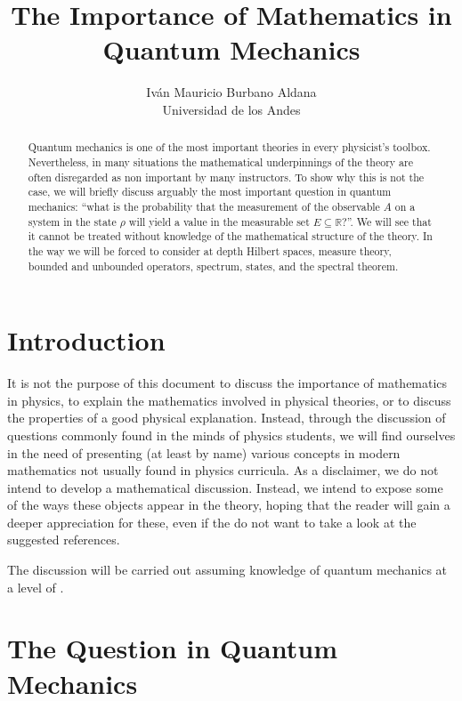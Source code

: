 \documentclass{article}
\title{The Importance of Mathematics in Quantum Mechanics}
\author{Iván Mauricio Burbano Aldana \\ Universidad de los Andes}
\begin{document}
\maketitle

\begin{abstract}

Quantum mechanics is one of the most important theories in every physicist's toolbox. Nevertheless, in many situations the mathematical underpinnings of the theory are often disregarded as non important by many instructors. To show why this is not the case, we will briefly discuss arguably the most important question in quantum mechanics: ``what is the probability that the measurement of the observable $A$ on a system in the state $\rho$ will yield a value in the measurable set $E\subseteq\mathbb{R}$?''. We will see that it cannot be treated without knowledge of the mathematical structure of the theory. In the way we will be forced to consider at depth Hilbert spaces, measure theory, bounded and unbounded operators, spectrum, states, and the spectral theorem. 

\end{abstract}

\section{Introduction}

It is not the purpose of this document to discuss the importance of mathematics in physics, to explain the mathematics involved in physical theories, or to discuss the properties of a good physical explanation. Instead, through the discussion of questions commonly found in the minds of physics students, we will find ourselves in the need of presenting (at least by name) various concepts in modern mathematics not usually found in physics curricula. As a disclaimer, we do not intend to develop a mathematical discussion. Instead, we intend to expose some of the ways these objects appear in the theory, hoping that the reader will gain a deeper appreciation for these, even if the do not want to take a look at the suggested references.   

The discussion will be carried out assuming knowledge of quantum mechanics at a level of \cite{Zettili2009}. 

\section{The Question in Quantum Mechanics}
\end{document}
